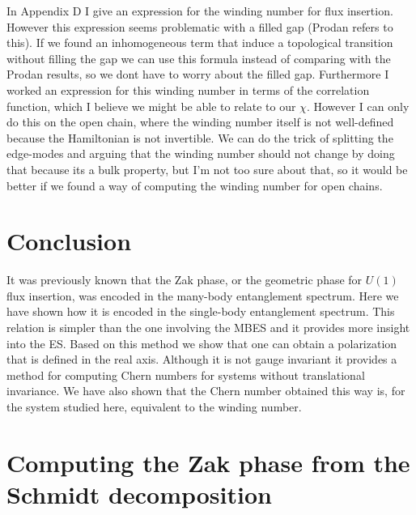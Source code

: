 \documentclass[twocolumn,amsmath,longbibliography,amssymb,superscriptaddress]{revtex4-1}
\newcommand{\carlos}[1]{{\color{red} #1}}
\begin{document}
\carlos{In Appendix D I give an expression for the winding number for flux insertion. However this expression seems problematic with a filled gap (Prodan refers to this). If we found an inhomogeneous term that induce a topological transition without filling the gap we can use this formula instead of comparing with the Prodan results, so we dont have to worry about the filled gap. 
Furthermore I worked an expression for this winding number in terms of the correlation function, which I believe we might be able to relate to our $\chi$. However I can only do this on the open chain, where the winding number itself is not well-defined because the Hamiltonian is not invertible. We can do the trick of splitting the edge-modes and arguing that the winding number should not change by doing that because its a  bulk property, but I'm not too sure about that, so it would be better if we found a way of computing the winding number for open chains.   }



\section{Conclusion}

It was previously known that the Zak phase, or the geometric phase for $U(1)$ flux insertion, was encoded in the many-body entanglement spectrum. Here we have shown how it is encoded in the single-body entanglement spectrum. This relation is simpler than the one involving the MBES and it provides more insight into the ES. Based on this method we show that one can obtain a polarization that is defined in the real axis. Although it is not gauge invariant it provides a method for computing Chern numbers for systems without translational invariance. We have also shown that the Chern number obtained this way is, for the system studied here, equivalent to the winding number.

	

	
\appendix


\section{Computing the Zak phase from the Schmidt decomposition}\label{app:pollmann}
\end{document}
